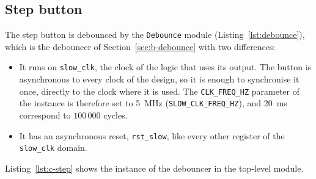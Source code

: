 \documentclass{article}
\begin{document}
\subsection{Step button}
\label{sec:c-step}
The step button is debounced by the \texttt{Debounce} module
(Listing~\ref{lst:debounce}), which is the debouncer of
Section~\ref{sec:b-debounce} with two differences:
\begin{itemize}
  \item It runs on \texttt{slow\_clk}, the clock of the logic that uses its output.
        The button is asynchronous to every clock of the design, so it is enough to
        synchronise it once, directly to the clock where it is used. The
        \texttt{CLK\_FREQ\_HZ} parameter of the instance is therefore set to
        \SI{5}{\mega\hertz} (\texttt{SLOW\_CLK\_FREQ\_HZ}), and \SI{20}{\milli\second}
        correspond to $100\,000$ cycles.
  \item It has an asynchronous reset, \texttt{rst\_slow}, like every other register of
        the \texttt{slow\_clk} domain.
\end{itemize}

Listing~\ref{lst:c-step} shows the instance of the debouncer in the top-level module.




\end{document}
